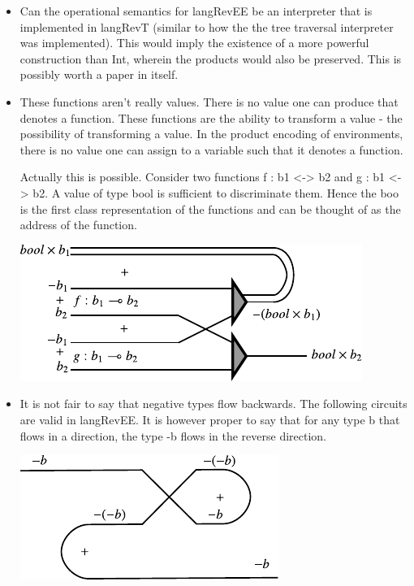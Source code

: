 \documentclass[preprint]{sigplanconf}
\begin{document}
\begin{itemize}

\item Can the operational semantics for {{langRevEE}} be an
  interpreter that is implemented in {{langRevT}} (similar to how the
  the tree traversal interpreter was implemented). This would imply
  the existence of a more powerful construction than Int, wherein the
  products would also be preserved. This is possibly worth a paper in
  itself.

\item These functions aren't really values. There is no value one can
  produce that denotes a function. These functions are the ability to
  transform a value - the possibility of transforming a value.  In the
  product encoding of environments, there is no value one can assign
  to a variable such that it denotes a function.


Actually this is possible. Consider two functions {{f : b1 <-> b2}}
and {{g : b1 <-> b2}}. A value of type {{bool}} is sufficient to
discriminate them. Hence the {{boo}} is the first class representation
of the functions and can be thought of as the address of the function. 

\begin{center}
  \includegraphics{diagrams/dispatch.pdf}
\end{center}


\item It is not fair to say that negative types flow backwards. The
  following circuits are valid in {{langRevEE}}. It is however proper
  to say that for any type {{b}} that flows in a direction, the type
  {{-b}} flows in the reverse direction. 

\begin{center}
  \includegraphics{diagrams/neg_circuit1.pdf}
\end{center}


\end{itemize}
\end{document}
